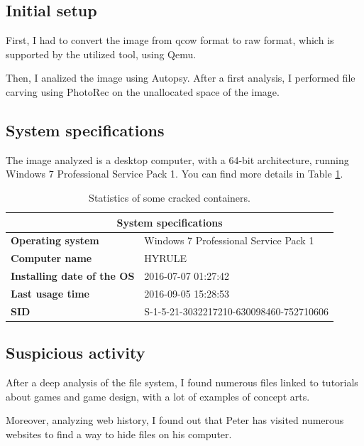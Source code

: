 \documentclass[12pt]{article}
\begin{document}
\subsection{Initial setup}

First, I had to convert the image from qcow format to raw format, which is supported by the utilized tool, using Qemu.

Then, I analized the image using Autopsy. After a first analysis, I performed file carving using PhotoRec on the unallocated space of the image.

\subsection{System specifications}

The image analyzed is a desktop computer, with a 64-bit architecture, running Windows 7 Professional Service Pack 1. 
You can find more details in Table \ref{table:stats}.

\begin{table}[!ht]
    \centering
    \begin{tabular}{ll}
    \toprule
        \multicolumn{2}{c}{\textbf{System specifications}} \\
        \midrule
        \textbf{Operating system} & Windows 7 Professional Service Pack 1 \\
        \textbf{Computer name} & HYRULE \\
        \textbf{Installing date of the OS} & 2016-07-07 01:27:42 \\
        \textbf{Last usage time} & 2016-09-05 15:28:53 \\
        \textbf{SID} & S-1-5-21-3032217210-630098460-752710606 \\
    \bottomrule
    \end{tabular}
    \caption{Statistics of some cracked containers.}
    \label{table:stats}
\end{table}

\subsection{Suspicious activity}

After a deep analysis of the file system, I found numerous files linked to tutorials about games and game design, with a lot of examples of concept arts. 

Moreover, analyzing web history, I found out that Peter has visited numerous websites to find a way to hide files on his computer. 
\end{document}

